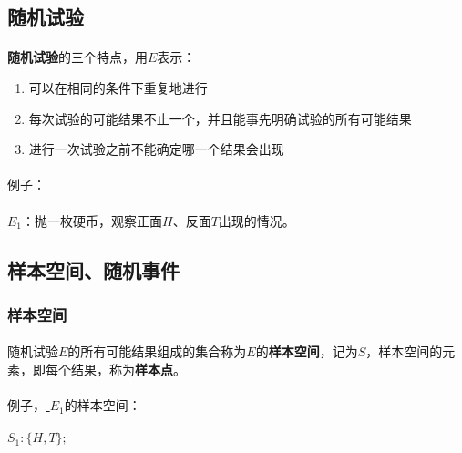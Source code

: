 \subsection{随机试验}
\paragraph{}
\textbf{随机试验}的三个特点，用$E$表示：

\begin{enumerate}
  \item 可以在相同的条件下重复地进行
  \item 每次试验的可能结果不止一个，并且能事先明确试验的所有可能结果
  \item 进行一次试验之前不能确定哪一个结果会出现
\end{enumerate}

\paragraph{}
例子：

\label{s1_1}
\paragraph{}
$E_1$：抛一枚硬币，观察正面$H$、反面$T$出现的情况。

\subsection{样本空间、随机事件}
\subsubsection{样本空间}
\paragraph{}

随机试验$E$的所有可能结果组成的集合称为$E$的\textbf{样本空间}，记为$S$，样本空间的元素，即每个结果，称为\textbf{样本点}。

\paragraph{}
例子，\hyperref[s1_1]{\color{blue} \underline{$E_1$}}的样本空间：

\paragraph{}
$S_1: \{H, T\};$

